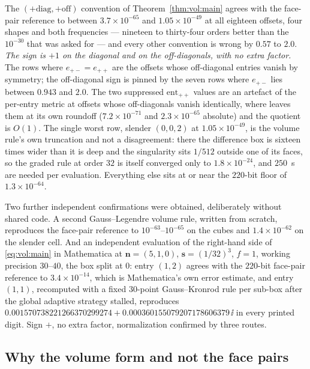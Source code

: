 \noindent
The $(+\text{diag},+\text{off})$ convention of Theorem~\ref{thm:vol:main} agrees with the
face-pair reference to between $3.7\times10^{-65}$ and $1.05\times10^{-49}$ at all
eighteen offsets, four shapes and both frequencies --- nineteen to thirty-four orders
better than the $10^{-30}$ that was asked for --- and every other convention is wrong by
$0.57$ to $2.0$. \emph{The sign is $+1$ on the diagonal and on the off-diagonals, with no
extra factor.} The rows where $e_{+-} = e_{++}$ are the offsets whose off-diagonal
entries vanish by symmetry; the off-diagonal sign is pinned by the seven rows where
$e_{+-}$ lies between $0.943$ and $2.0$. The two suppressed $\mathrm{ent}_{++}$ values
are an artefact of the per-entry metric at offsets whose off-diagonals vanish
identically, where  leaves them at its own roundoff
($7.2\times10^{-71}$ and $2.3\times10^{-65}$ absolute) and the quotient is $O(1)$. The
single worst row, slender $(0,0,2)$ at $1.05\times10^{-49}$, is the volume rule's own
truncation and not a disagreement: there the difference box is sixteen times wider than
it is deep and the singularity sits $1/512$ outside one of its faces, so the graded rule
at order $32$ is itself converged only to $1.8\times10^{-24}$, and $250$~s are needed per
evaluation. Everything else sits at or near the $220$-bit floor of $1.3\times10^{-64}$.

Two further independent confirmations were obtained, deliberately without shared code.
A second  Gauss--Legendre volume rule, written from scratch, reproduces the
face-pair reference to $10^{-63}$--$10^{-65}$ on the cubes and $1.4\times10^{-62}$ on the
slender cell. And an independent  evaluation of the right-hand side of
\eqref{eq:vol:main} in Mathematica at $\mathbf{n} = (5,1,0)$, $\mathbf{s} = (1/32)^3$,
$f = 1$, working precision $30$--$40$, the box split at $0$: entry $(1,2)$ agrees with the
$220$-bit face-pair reference to $3.4\times10^{-14}$, which is Mathematica's own error
estimate, and entry $(1,1)$, recomputed with a fixed $30$-point Gauss--Kronrod rule per
sub-box after the global adaptive strategy stalled, reproduces
$0.001570738221266370299274 + 0.000360155079207178606379\,\ii$ in every printed digit.
Sign $+$, no extra factor, normalization confirmed by three routes.

\subsection{Why the volume form and not the face pairs}
\label{sec:vol:amp}

